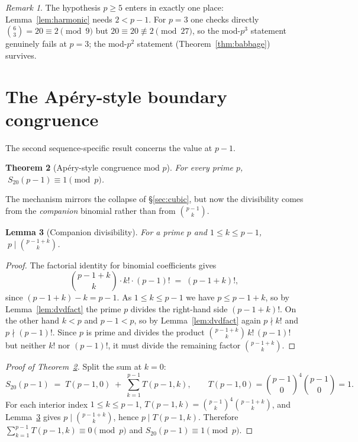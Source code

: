 \documentclass[11pt,a4paper]{article}
\newtheorem{theorem}{Theorem}[section]
\newtheorem{lemma}[theorem]{Lemma}
\theoremstyle{definition}
\theoremstyle{remark}
\newtheorem{remark}[theorem]{Remark}
\newcommand{\Sx}{S_{20}}
\begin{document}
\begin{remark}
The hypothesis $p\ge 5$ enters in exactly one place: Lemma~\ref{lem:harmonic}
needs $2<p-1$.  For $p=3$ one checks directly $\binom{6}{3}=20\equiv 2\pmod 9$
but $20\equiv 20\not\equiv2\pmod{27}$, so the mod-$p^3$ statement genuinely
fails at $p=3$; the mod-$p^2$ statement (Theorem~\ref{thm:babbage}) survives.
\end{remark}

\section{The Ap\'ery-style boundary congruence}\label{sec:apery}

The second sequence-specific result concerns the value at $p-1$.

\begin{theorem}[Ap\'ery-style congruence mod $p$]\label{thm:apery}
For every prime $p$, $\;\Sx(p-1)\equiv 1\pmod p$.
\end{theorem}

The mechanism mirrors the collapse of \S\ref{sec:cubic}, but now the
divisibility comes from the \emph{companion} binomial rather than from
$\binom{p-1}{k}$.

\begin{lemma}[Companion divisibility]\label{lem:companion}
For a prime $p$ and $1\le k\le p-1$, $\;p\mid\binom{p-1+k}{k}$.
\end{lemma}

\begin{proof}
The factorial identity for binomial coefficients gives
\[
  \binom{p-1+k}{k}\cdot k!\cdot (p-1)! \;=\; (p-1+k)!,
\]
since $(p-1+k)-k=p-1$.  As $1\le k\le p-1$ we have $p\le p-1+k$, so by
Lemma~\ref{lem:dvdfact} the prime $p$ divides the right-hand side $(p-1+k)!$.
On the other hand $k<p$ and $p-1<p$, so by Lemma~\ref{lem:dvdfact} again $p\nmid
k!$ and $p\nmid(p-1)!$.  Since $p$ is prime and divides the product
$\binom{p-1+k}{k}\,k!\,(p-1)!$ but neither $k!$ nor $(p-1)!$, it must divide the
remaining factor $\binom{p-1+k}{k}$.
\end{proof}

\begin{proof}[Proof of Theorem~\ref{thm:apery}]
Split the sum at $k=0$:
\[
  \Sx(p-1) \;=\; T(p-1,0) \;+\; \sum_{k=1}^{p-1} T(p-1,k),
  \qquad T(p-1,0)=\binom{p-1}{0}^4\binom{p-1}{0}=1.
\]
For each interior index $1\le k\le p-1$,
$T(p-1,k)=\binom{p-1}{k}^{4}\binom{p-1+k}{k}$, and
Lemma~\ref{lem:companion} gives $p\mid\binom{p-1+k}{k}$, hence $p\mid
T(p-1,k)$.  Therefore $\sum_{k=1}^{p-1}T(p-1,k)\equiv 0\pmod p$ and
$\Sx(p-1)\equiv 1\pmod p$.
\end{proof}
\end{document}
